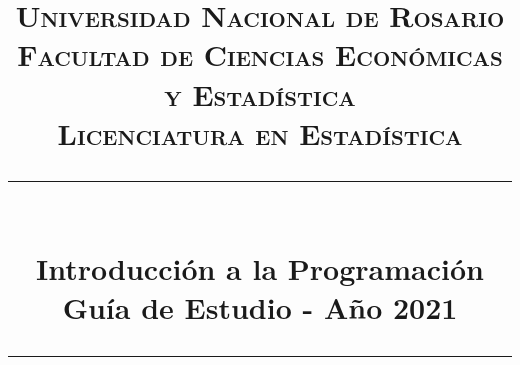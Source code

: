 \usepackage{booktabs}
\usepackage{multirow}

\usepackage[spanish]{babel}
\usepackage[utf8]{inputenc}


\usepackage[margin=2cm]{geometry}
\usepackage{fancyhdr}
\pagestyle{fancy}
\renewcommand{\footrulewidth}{0.4pt}
\renewcommand{\sectionmark}[1]{\markright{#1}}
\fancyhead[R] {\leftmark}

\makeatletter
\renewcommand{\@chapapp}{Unidad}
\makeatother

\usepackage{etoolbox}
\patchcmd{\chapter}{\thispagestyle{plain}}{\thispagestyle{fancy}}{}{}


\usepackage{tocloft}
\renewcommand{\cftchapleader}{\cftdotfill{\cftdotsep}} %

\newcommand{\horrule}[1]{\rule{\linewidth}{#1}}
\title{
	\normalfont \normalsize
	\textsc{
		Universidad Nacional de Rosario \\
		Facultad de Ciencias Económicas y Estadística \\
		Licenciatura en Estadística
	} \\ [25pt]
	\horrule{2pt} \\[0.4cm]
	\huge \textbf{Introducción a la Programación} \\
	\bigbreak
	Guía de Estudio - Año 2021\\
	\horrule{2pt} \\[0.5cm]}

